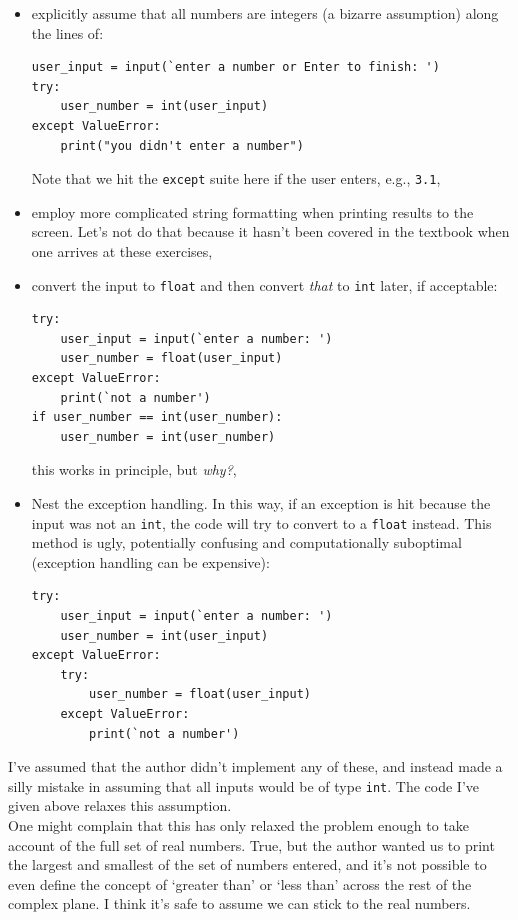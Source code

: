 \documentclass{report}
\begin{document}
\begin{itemize}
\item explicitly assume that all numbers are integers (a bizarre assumption) along the lines of:
\begin{verbatim}
user_input = input(`enter a number or Enter to finish: ')
try:
    user_number = int(user_input)
except ValueError:
    print("you didn't enter a number")
\end{verbatim}
Note that we hit the \verb|except| suite here if the user enters, e.g., \verb|3.1|,
\item employ more complicated string formatting when printing results to the screen. Let's not do that because it hasn't been covered in the textbook when one arrives at these exercises,
\item convert the input to \verb|float| and then convert \textit{that} to \verb|int| later, if acceptable:
\begin{verbatim}
try:
    user_input = input(`enter a number: ')
    user_number = float(user_input)
except ValueError:
    print(`not a number')
if user_number == int(user_number):
    user_number = int(user_number)
\end{verbatim}
this works in principle, but \textit{why?},
\item Nest the exception handling. In this way, if an exception is hit because the input was not an \verb|int|, the code will try to convert to a \verb|float| instead. This method is ugly, potentially confusing and computationally suboptimal (exception handling can be expensive):
\begin{verbatim}
try:
    user_input = input(`enter a number: ')
    user_number = int(user_input)
except ValueError:
    try:
        user_number = float(user_input)
    except ValueError:
        print(`not a number')
\end{verbatim}
\end{itemize}
I've assumed that the author didn't implement any of these, and instead made a silly mistake in assuming that all inputs would be of type \verb|int|. The code I've given above relaxes this assumption.\\
\indent One might complain that this has only relaxed the problem enough to take account of the full set of real numbers. True, but the author wanted us to print the largest and smallest of the set of numbers entered, and it's not possible to even define the concept of `greater than' or `less than' across the rest of the complex plane. I think it's safe to assume we can stick to the real numbers.
\newpage
\end{document}
